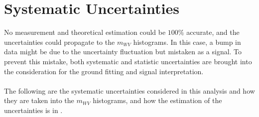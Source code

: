 \section{Systematic Uncertainties}
No measurement and theoretical estimation could be $100\%$ accurate, and the uncertainties could propagate to the $m_{WV}$ histograms. In this case, a bump in data might be due to the uncertainty fluctuation but mistaken as a signal. To prevent this mistake, both systematic and statistic uncertainties are brought into the consideration for the ground fitting and signal interpretation.
\\
\\The following are the systematic uncertainties considered in this analysis and how they are taken into the $m_{WV}$ histograms, and how the estimation of the uncertainties is in \cite{PERF-2016-01,ATL-PHYS-PUB-2015-037,ATLAS:2019pzw,PERF-2016-04,ATLAS-CONF-2014-018,Herde:2059849}.
